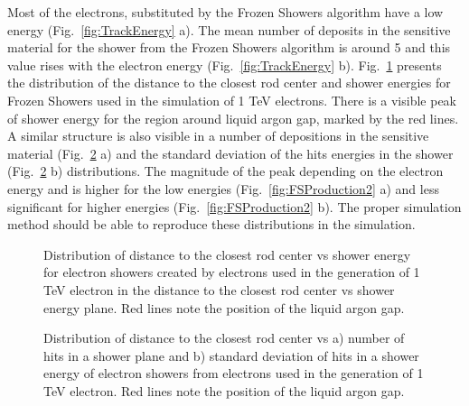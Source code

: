 Most of the electrons, substituted by the Frozen Showers algorithm have a low energy (Fig.~\ref{fig:TrackEnergy} a).   The mean number of deposits in the sensitive material for the shower from the Frozen Showers algorithm is around 5 and this value rises with the electron energy (Fig.~\ref{fig:TrackEnergy} b).  Fig.~\ref{fig:FSProduction} presents the distribution of the distance to the closest rod center and shower energies for Frozen Showers used in the simulation of 1 TeV electrons. There is a visible peak of shower energy for the region around liquid argon gap, marked by the red lines. A similar structure is also visible in a number of depositions in the sensitive material (Fig.~\ref{fig:ShowerProp} a) and the standard deviation of the hits energies in the shower (Fig.~\ref{fig:ShowerProp} b) distributions. The magnitude of the peak depending on the electron energy and is higher for the low energies (Fig.~\ref{fig:FSProduction2} a) and less significant for higher energies (Fig.~\ref{fig:FSProduction2} b). The proper simulation method should be able to reproduce these distributions in the simulation.

\begin{figure}[!tbp]
\caption{Distribution of distance to the closest rod center vs shower energy for electron showers created by electrons used in the generation of 1 TeV electron in the distance to the closest rod center vs shower energy plane. Red lines note the position of the liquid argon gap. }
\label{fig:FSProduction}
\end{figure}

\begin{figure}[!tbp]
\begin{minipage}[h]{0.49\linewidth}
\end{minipage}
\hfill
\begin{minipage}[h]{0.49\linewidth}
\end{minipage}
\caption{Distribution of distance to the closest rod center vs a) number of hits in a shower plane and b) standard deviation of hits in a shower energy of electron showers from electrons used in the generation of 1 TeV electron. Red lines note the position of the liquid argon gap.}
\label{fig:ShowerProp}
\end{figure}

